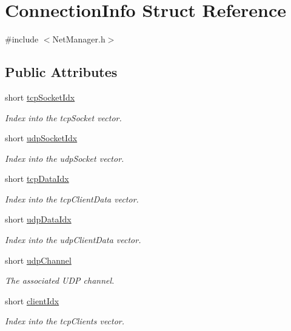 \hypertarget{structConnectionInfo}{\section{Connection\-Info Struct Reference}
\label{structConnectionInfo}
}


{\ttfamily \#include $<$Net\-Manager.\-h$>$}

\subsection*{Public Attributes}
\begin{DoxyCompactItemize}
\item 
short \hyperlink{structConnectionInfo_a1e837b6519e7035ad689232289931e82}{tcp\-Socket\-Idx}
\begin{DoxyCompactList}\small\item\em Index into the tcp\-Socket vector. \end{DoxyCompactList}\item 
short \hyperlink{structConnectionInfo_ac52c36a648203e28b495cea6d7ad29ba}{udp\-Socket\-Idx}
\begin{DoxyCompactList}\small\item\em Index into the udp\-Socket vector. \end{DoxyCompactList}\item 
short \hyperlink{structConnectionInfo_ae74bd85133eb1b4c3cec7431c280fa13}{tcp\-Data\-Idx}
\begin{DoxyCompactList}\small\item\em Index into the tcp\-Client\-Data vector. \end{DoxyCompactList}\item 
short \hyperlink{structConnectionInfo_a77f71cc46ad9033a81184cae84170277}{udp\-Data\-Idx}
\begin{DoxyCompactList}\small\item\em Index into the udp\-Client\-Data vector. \end{DoxyCompactList}\item 
short \hyperlink{structConnectionInfo_a04b5d2e6b358b6b9337b75dbeb01197e}{udp\-Channel}
\begin{DoxyCompactList}\small\item\em The associated U\-D\-P channel. \end{DoxyCompactList}\item 
short \hyperlink{structConnectionInfo_a57fe4cd91d04afd5f802957aef5cd835}{client\-Idx}
\begin{DoxyCompactList}\small\item\em Index into the tcp\-Clients vector. \end{DoxyCompactList}\item 

\end{DoxyCompactItemize}

